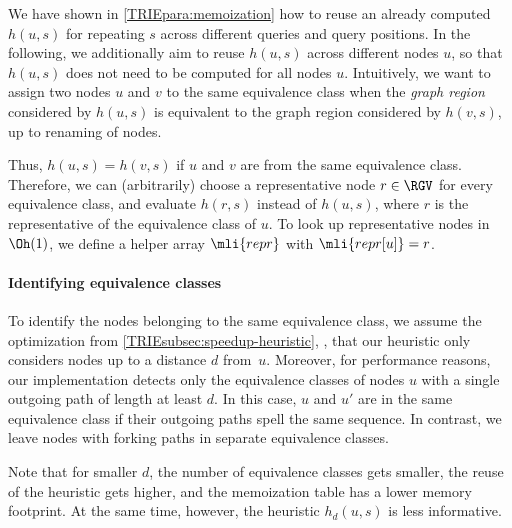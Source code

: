 We have shown in \cref{TRIEpara:memoization} how to reuse an already computed
$h(u,s)$ for repeating $s$ across different queries and query positions. In the
following, we additionally aim to reuse $h(u,s)$ across different nodes $u$, so
that $h(u,s)$ does not need to be computed for all nodes $u$. Intuitively, we
want to assign two nodes $u$ and $v$ to the same equivalence class when the
\emph{graph region} considered by $h(u,s)$ is equivalent to the graph region
considered by $h(v,s)$, up to renaming of nodes.

Thus, $h(u,s)=h(v,s)$ if $u$ and $v$ are from the same equivalence class.
Therefore, we can (arbitrarily) choose a representative node $r \in \RGV$ for
every equivalence class, and evaluate $h(r,s)$ instead of $h(u,s)$, where $r$ is
the representative of the equivalence class of $u$. To look up representative
nodes in $\Oh(1)$, we define a helper array $\mli{repr}$ with $\mli{repr[u]} =
r$.

\paragraph{Identifying equivalence classes}
To identify the nodes belonging to the same equivalence class, we assume the
optimization from \cref{TRIEsubsec:speedup-heuristic}, \ie, that our heuristic only
considers nodes up to a distance $d$ from~$u$.
%
Moreover, for performance reasons, our implementation detects only the
equivalence classes of nodes $u$ with a single outgoing path of length at least
$d$.
%
In this case, $u$ and $u'$ are in the same equivalence class if their outgoing
paths spell the same sequence.
%
In contrast, we leave nodes with forking paths in separate equivalence classes.

Note that for smaller $d$, the number of equivalence classes gets smaller, the
reuse of the heuristic gets higher, and the memoization table has a lower memory
footprint. At the same time, however, the heuristic $h_d(u,s)$ is less
informative.
